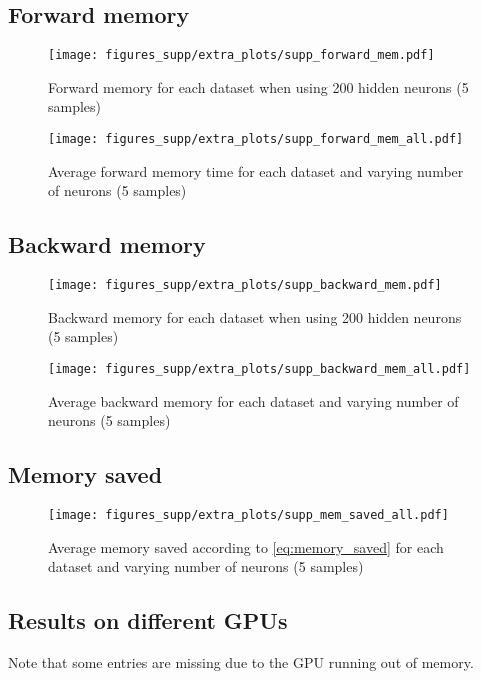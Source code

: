 \documentclass{article}
\begin{document}
\newpage
\subsection{Forward memory}
\begin{figure}[!h]
\centering 
\texttt{[image: figures\_supp/extra\_plots/supp\_forward\_mem.pdf]}
\caption{Forward memory for each dataset when using 200 hidden neurons (5 samples)}
\end{figure}
\begin{figure}[!h]
\centering 
\texttt{[image: figures\_supp/extra\_plots/supp\_forward\_mem\_all.pdf]}
\caption{Average forward memory time for each dataset and varying number of neurons (5 samples)}
\end{figure}


\subsection{Backward memory}
\begin{figure}[!h]
\centering 
\texttt{[image: figures\_supp/extra\_plots/supp\_backward\_mem.pdf]}
\caption{Backward memory for each dataset when using 200 hidden neurons (5 samples)}
\end{figure}
\begin{figure}[!h]
\centering 
\texttt{[image: figures\_supp/extra\_plots/supp\_backward\_mem\_all.pdf]}
\caption{Average backward memory for each dataset and varying number of neurons (5 samples)}
\end{figure}

\newpage
\subsection{Memory saved}
\begin{figure}[!h]
\centering 
\texttt{[image: figures\_supp/extra\_plots/supp\_mem\_saved\_all.pdf]}
\caption{Average memory saved according to \eqref{eq:memory_saved} for each dataset and varying number of neurons (5 samples)}
\end{figure}


\subsection{Results on different GPUs} \label{supp:other_gpus}

Note that some entries are missing due to the GPU running out of memory.
\end{document}
